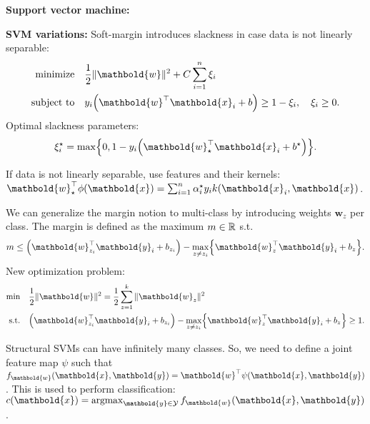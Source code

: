 \documentclass[9pt]{extarticle}
\newenvironment{topic}[1]
{\textbf{\sffamily \colorbox{black}{\rlap{\textbf{\textcolor{white}{#1}}}\hspace{\linewidth}\hspace{-2\fboxsep}}}}
{}
\newenvironment{subtopic}[1]
{\textbf{\sffamily #1:}}
{}
\renewcommand{\vec}[1]{\ensuremath{\mathbold{#1}}}
\begin{document}
\begin{multicols*}{3}
\begin{topic}{Convex optimization and SVMs}
\begin{subtopic}{Support vector machine}
        \end{subtopic}

        \begin{subtopic}{SVM variations}
            Soft-margin introduces slackness in case data is not linearly separable:
            \begin{align*}
                \text{minimize}   & \quad \frac{1}{2} \| \vec{w} \|^2 + C \sum_{i=1}^{n} \xi_i                                \\
                \text{subject to} & \quad y_i \lft(\transpose{\vec{w}} \vec{x}_i +b \rgt) \geq 1 - \xi_i, \quad \xi_i \geq 0.
            \end{align*}
            Optimal slackness parameters: \[
                \xi_i^\star = \max \lft\{ 0, 1 - y_i \lft(\transpose{\vec{w}_{\star}} \vec{x}_i + b^\star\rgt) \rgt\}.
            \]

            If data is not linearly separable, use features and their kernels: $\transpose{\vec{w}_{\star}}
                \phi(\vec{x}) = \sum_{i=1}^{n} \alpha_i^\star y_i k(\vec{x}_i, \vec{x})$.

            We can generalize the margin notion to multi-class by introducing weights $\vec{w}_z$ per class.
            The margin is defined as the maximum $m \in \mathbb{R}$ s.t.\ \[
                m \leq \lft( \transpose{\vec{w}_{z_i}} \vec{y}_i + b_{z_i} \rgt) - \max_{z \neq z_i} \lft\{ \transpose{\vec{w}_z} \vec{y}_i + b_z \rgt\}.
            \]
            New optimization problem:
            \begin{align*}
                \text{min}  & \quad \frac{1}{2} \| \vec{w} \|^2 = \frac{1}{2} \sum_{z=1}^{k} \| \vec{w}_z \|^2                                                                \\
                \text{s.t.} & \quad \lft( \transpose{\vec{w}_{z_i}} \vec{y}_i + b_{z_i} \rgt) - \max_{z \neq z_i} \lft\{ \transpose{\vec{w}_z} \vec{y}_i + b_z \rgt\} \geq 1.
            \end{align*}

            Structural SVMs can have infinitely many classes. So, we need to define a joint feature map $\psi$
            such that $f_{\vec{w}}(\vec{x}, \vec{y}) = \transpose{\vec{w}} \psi(\vec{x}, \vec{y})$. This is
            used to perform classification: $c(\vec{x}) = \argmax_{\vec{y} \in \mathcal{Y}}
                f_{\vec{w}}(\vec{x}, \vec{y})$.


\end{subtopic}
\end{topic}
\end{multicols*}
\end{document}
